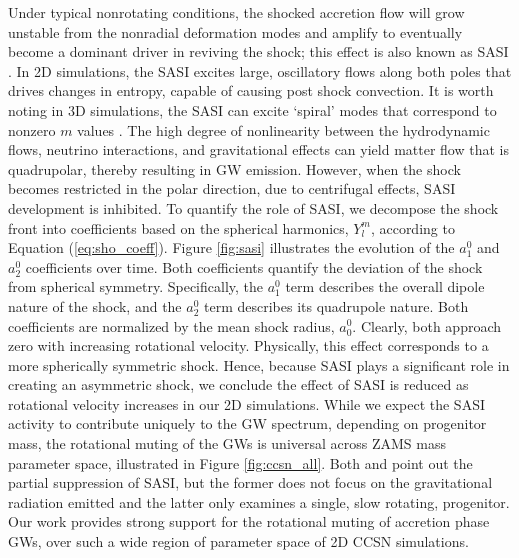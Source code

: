 \documentclass[twocolumn,times]{aastex62}  %
\begin{document}
Under typical nonrotating conditions, the shocked accretion flow will grow unstable from the nonradial deformation modes and amplify to eventually become a dominant driver in reviving the shock; this effect is also known as SASI \citep{scheck:2008,marek:2009a}.  In 2D simulations, the SASI excites large, oscillatory flows along both poles that drives changes in entropy, capable of causing post shock convection.  It is worth noting in 3D simulations, the SASI can excite `spiral' modes that correspond to nonzero $m$ values \citep{blondin:2007,kuroda:2016}.  The high degree of nonlinearity between the hydrodynamic flows, neutrino interactions, and gravitational effects can yield matter flow that is quadrupolar, thereby resulting in GW emission.  However, when the shock becomes restricted in the polar direction, due to centrifugal effects, SASI development is inhibited.  To quantify the role of SASI, we decompose the shock front into coefficients based on the spherical harmonics, $Y_l^m$, according to Equation (\ref{eq:sho_coeff}). Figure \ref{fig:sasi} illustrates the evolution of the $a_1^0$ and $a_2^0$ coefficients over time.  Both coefficients quantify the deviation of the shock from spherical symmetry.  Specifically, the $a_1^0$ term describes the overall dipole nature of the shock, and the $a_2^0$ term describes its quadrupole nature.  Both coefficients are normalized by the mean shock radius, $a^0_0$.  Clearly, both approach zero with increasing rotational velocity.  Physically, this effect corresponds to a more spherically symmetric shock.  Hence, because SASI plays a significant role in creating an asymmetric shock, we conclude the effect of SASI is reduced as rotational velocity increases in our 2D simulations.
While we expect the SASI activity to contribute uniquely to the GW spectrum, depending on progenitor mass, the rotational muting of the GWs is universal across ZAMS mass parameter space, illustrated in Figure \ref{fig:ccsn_all}. 
Both \citet{burrows:2007}  and \citet{moro:2018} point out the partial suppression of SASI, but the former does not focus on the gravitational radiation emitted and the latter only examines a single, slow rotating, progenitor.  Our work provides strong support for the rotational muting of accretion phase GWs, over such a wide region of parameter space of 2D CCSN simulations. 
 
\end{document}

